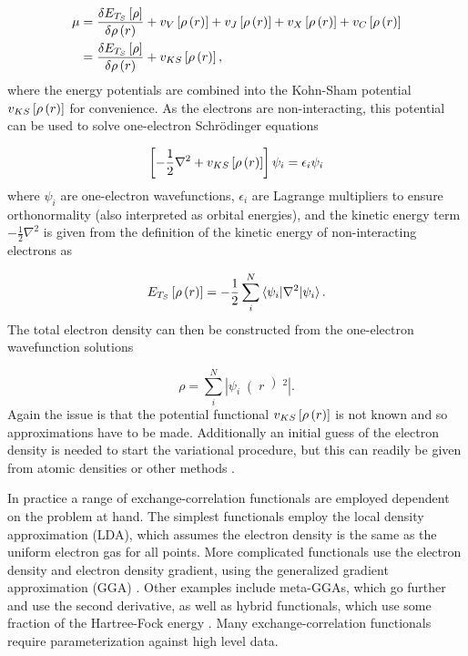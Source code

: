 \begin{equation}
    \begin{split}
        \mu &= \frac{\delta  E_{T_S} \left[ \rho \right]}{\delta \rho\left(r\right)} + v_{V} \left[ \rho\left(r\right) \right] + v_{J} \left[ \rho\left(r\right) \right] + v_{X} \left[ \rho\left(r\right) \right] + v_{C} \left[ \rho\left(r\right) \right] \\
            &= \frac{\delta  E_{T_S} \left[ \rho \right]}{\delta \rho\left(r\right)} + v_{KS} \left[ \rho\left(r\right) \right],
    \end{split}
\end{equation}
%
where the energy potentials are combined into the Kohn-Sham potential $v_{KS} \left[ \rho\left(r\right) \right]$ for
convenience. As the electrons are non-interacting, this potential can be used to
solve one-electron Schrödinger equations

\begin{equation}
    \left[ -\frac{1}{2} \nabla^2 + v_{KS} \left[ \rho\left(r\right) \right] \right] \psi_i = \epsilon_i \psi_i
\end{equation}
%
where $\psi_i$ are one-electron wavefunctions, $\epsilon_i$ are Lagrange multipliers
to ensure orthonormality (also interpreted as orbital energies), and the kinetic 
energy term $-\frac{1}{2} \nabla ^2$ is given from the definition of the kinetic 
energy of non-interacting electrons as

\begin{equation}
    E_{T_S} \left[ \rho\left(r\right) \right] = -\frac{1}{2} \sum_i^N \braket{\psi_i|\nabla^2|\psi_i}.
\end{equation}
%
The total electron density can then be constructed from the one-electron wavefunction
solutions

\begin{equation}
    \rho = \sum_i^N \left\lvert \psi_i \right( r \left)^2 \right\rvert.
\end{equation}
%
Again the issue is that the potential functional $v_{KS} \left[ \rho\left(r\right) \right]$ is
not known and so approximations have to be made. Additionally an initial guess of
the electron density is needed to start the variational procedure, but this can 
readily be given from atomic densities or other methods \cite{Lehtola2019}.

In practice a range of exchange-correlation functionals are employed dependent on
the problem at hand. The simplest functionals employ the local density approximation
(LDA), which assumes the electron density is the same as the uniform electron gas
for all points. More complicated functionals use the electron density and electron
density gradient, using the generalized gradient approximation (GGA) \cite{Langreth1983}.
Other examples include meta-GGAs, which go further and use the second derivative, 
as well as hybrid functionals, which use some fraction of the Hartree-Fock energy
\cite{Sun2011, Becke1993}. Many exchange-correlation functionals require parameterization 
against high level data.

